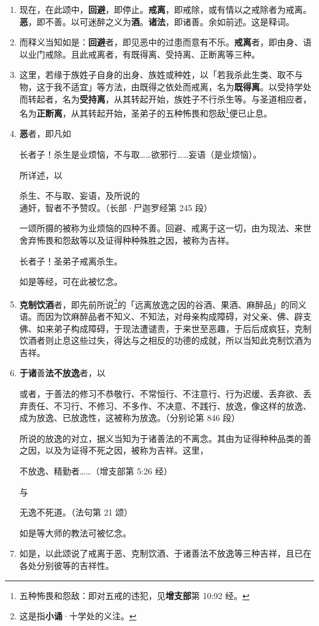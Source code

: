 \begin{enumerate}\item 现在，在此颂中，\textbf{回避}，即停止。\textbf{戒离}，即戒除，或有情以之戒除者为戒离。\textbf{恶}，即不善。以可迷醉之义为\textbf{酒}。\textbf{诸法}，即诸善。余如前述。这是释词。
\item 而释义当知如是：\textbf{回避}者，即见恶中的过患而意有不乐。\textbf{戒离}者，即由身、语以业门戒除。且此戒离者，有既得离、受持离、正断离等三种。
\item 这里，若缘于族姓子自身的出身、族姓或种姓，以「若我杀此生类、取不与物，这于我不适宜」等方法，由既得之依处而戒离，名为\textbf{既得离}。以受持学处而转起者，名为\textbf{受持离}，从其转起开始，族姓子不行杀生等。与圣道相应者，名为\textbf{正断离}，从其转起开始，圣弟子的五种怖畏和怨敌\footnote{五种怖畏和怨敌：即对五戒的违犯，见\textbf{增支部}第 10:92 经。}便已止息。
\item \textbf{恶}者，即凡如\begin{quoting}长者子！杀生是业烦恼，不与取……欲邪行……妄语（是业烦恼）。\end{quoting}所详述，以\begin{quoting}杀生、不与取、妄语，及所说的\\通奸，智者不予赞叹。（长部·尸迦罗经第 245 段）\end{quoting}一颂所摄的被称为业烦恼的四种不善。回避、戒离于这一切，由为现法、来世舍弃怖畏和怨敌等以及证得种种殊胜之因，被称为吉祥。\begin{quoting}长者子！圣弟子戒离杀生。\end{quoting}如是等经，可在此被忆念。
\item \textbf{克制饮酒}者，即先前所说\footnote{这是指\textbf{小诵}·十学处的义注。}的「远离放逸之因的谷酒、果酒、麻醉品」的同义语。而因为饮麻醉品者不知义、不知法，对母亲构成障碍，对父亲、佛、辟支佛、如来弟子构成障碍，于现法遭谴责，于来世至恶趣，于后后成疯狂，克制饮酒者则止息这些过失，得达与之相反的功德的成就，所以当知此克制饮酒为吉祥。
\item \textbf{于诸}善\textbf{法不放逸}者，以\begin{quoting}或者，于善法的修习不恭敬行、不常恒行、不注意行、行为迟缓、丢弃欲、丢弃责任、不习行、不修习、不多作、不决意、不践行、放逸，像这样的放逸、成为放逸、已放逸性，这被称为放逸。（分别论第 846 段）\end{quoting}所说的放逸的对立，据义当知为于诸善法的不离念。其由为证得种种品类的善之因，以及为证得不死之因，被称为吉祥。这里，\begin{quoting}不放逸、精勤者……（增支部第 5:26 经）\end{quoting}与\begin{quoting}无逸不死道。（法句第 21 颂）\end{quoting}如是等大师的教法可被忆念。
\item 如是，以此颂说了戒离于恶、克制饮酒、于诸善法不放逸等三种吉祥，且已在各处分别彼等的吉祥性。\end{enumerate}

